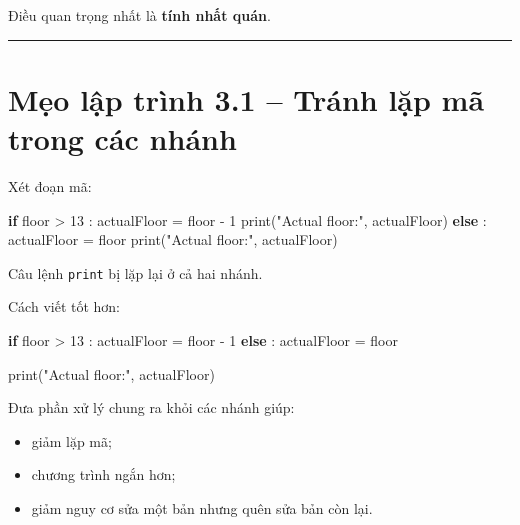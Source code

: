\documentclass[
  11pt,
  a4paper,
]{article}
\newenvironment{Shaded}{}{}
\newcommand{\BuiltInTok}[1]{\textcolor[rgb]{0.00,0.50,0.00}{#1}}
\newcommand{\ControlFlowTok}[1]{\textcolor[rgb]{0.00,0.44,0.13}{\textbf{#1}}}
\newcommand{\DecValTok}[1]{\textcolor[rgb]{0.25,0.63,0.44}{#1}}
\newcommand{\NormalTok}[1]{#1}
\newcommand{\OperatorTok}[1]{\textcolor[rgb]{0.40,0.40,0.40}{#1}}
\newcommand{\StringTok}[1]{\textcolor[rgb]{0.25,0.44,0.63}{#1}}
\providecommand{\tightlist}{%
  \setlength{\itemsep}{0pt}\setlength{\parskip}{0pt}}
\begin{document}
Điều quan trọng nhất là \textbf{tính nhất quán}.

\begin{center}\rule{0.5\linewidth}{0.5pt}\end{center}

\section{Mẹo lập trình 3.1 -- Tránh lặp mã trong các
nhánh}\label{mux1eb9o-lux1eadp-truxecnh-3.1-truxe1nh-lux1eb7p-muxe3-trong-cuxe1c-nhuxe1nh}

Xét đoạn mã:

\begin{Shaded}
\begin{Highlighting}[]
\ControlFlowTok{if}\NormalTok{ floor }\OperatorTok{\textgreater{}} \DecValTok{13}\NormalTok{ :}
\NormalTok{    actualFloor }\OperatorTok{=}\NormalTok{ floor }\OperatorTok{{-}} \DecValTok{1}
    \BuiltInTok{print}\NormalTok{(}\StringTok{"Actual floor:"}\NormalTok{, actualFloor)}
\ControlFlowTok{else}\NormalTok{ :}
\NormalTok{    actualFloor }\OperatorTok{=}\NormalTok{ floor}
    \BuiltInTok{print}\NormalTok{(}\StringTok{"Actual floor:"}\NormalTok{, actualFloor)}
\end{Highlighting}
\end{Shaded}

Câu lệnh \texttt{print} bị lặp lại ở cả hai nhánh.

Cách viết tốt hơn:

\begin{Shaded}
\begin{Highlighting}[]
\ControlFlowTok{if}\NormalTok{ floor }\OperatorTok{\textgreater{}} \DecValTok{13}\NormalTok{ :}
\NormalTok{    actualFloor }\OperatorTok{=}\NormalTok{ floor }\OperatorTok{{-}} \DecValTok{1}
\ControlFlowTok{else}\NormalTok{ :}
\NormalTok{    actualFloor }\OperatorTok{=}\NormalTok{ floor}

\BuiltInTok{print}\NormalTok{(}\StringTok{"Actual floor:"}\NormalTok{, actualFloor)}
\end{Highlighting}
\end{Shaded}

Đưa phần xử lý chung ra khỏi các nhánh giúp:

\begin{itemize}
\tightlist
\item
  giảm lặp mã;
\item
  chương trình ngắn hơn;
\item
  giảm nguy cơ sửa một bản nhưng quên sửa bản còn lại.
\end{itemize}
\end{document}
